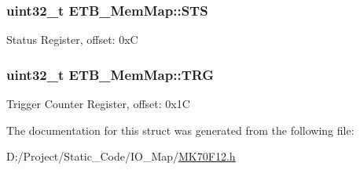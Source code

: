 \subsubsection[{S\+T\+S}]{\setlength{\rightskip}{0pt plus 5cm}uint32\+\_\+t E\+T\+B\+\_\+\+Mem\+Map\+::\+S\+T\+S}\label{struct_e_t_b___mem_map_a5a471e968aca953fb748c16b10d56939}
Status Register, offset\+: 0x\+C \hypertarget{struct_e_t_b___mem_map_a96dc184cb9f6ea6ba7b299b05c58d4ed}{}
\subsubsection[{T\+R\+G}]{\setlength{\rightskip}{0pt plus 5cm}uint32\+\_\+t E\+T\+B\+\_\+\+Mem\+Map\+::\+T\+R\+G}\label{struct_e_t_b___mem_map_a96dc184cb9f6ea6ba7b299b05c58d4ed}
Trigger Counter Register, offset\+: 0x1\+C 

The documentation for this struct was generated from the following file\+:\begin{DoxyCompactItemize}
\item 
D\+:/\+Project/\+Static\+\_\+\+Code/\+I\+O\+\_\+\+Map/\hyperlink{_m_k70_f12_8h}{M\+K70\+F12.\+h}\end{DoxyCompactItemize}
